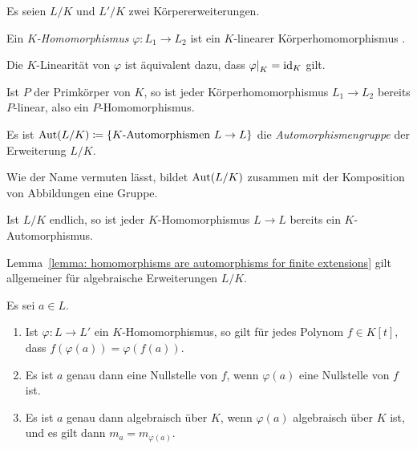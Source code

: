 Es seien $L/K$ und $L'/K$ zwei Körpererweiterungen.

\begin{definition}
  Ein \emph{$K$-Homomorphismus} $\varphi \colon L_1 \to L_2$ ist ein $K$-linearer Körperhomomorphismus .
\end{definition}

\begin{remark}
  Die $K$-Linearität von $\varphi$ ist äquivalent dazu, dass $\restrict{\varphi}{K} = \id_K$ gilt.
\end{remark}

\begin{example}
  Ist $P$ der Primkörper von $K$, so ist jeder Körperhomomorphismus $L_1 \to L_2$ bereits $P$-linear, also ein $P$-Homomorphismus.
\end{example}

\begin{definition}
  Es ist $\operatorname{Aut}(L/K) \coloneqq \{\text{$K$-Automorphismen $L \to L$}\}$ die \emph{Automorphismengruppe} der Erweiterung $L/K$.
\end{definition}

Wie der Name vermuten lässt, bildet $\operatorname{Aut}(L/K)$ zusammen mit der Komposition von Abbildungen eine Gruppe.

\begin{lemma}
  \label{lemma: homomorphisms are automorphisms for finite extensions}
  Ist $L/K$ endlich, so ist jeder $K$-Homomorphismus $L \to L$ bereits ein $K$-Automorphismus.
\end{lemma}

\begin{remark}
  Lemma~\ref{lemma: homomorphisms are automorphisms for finite extensions} gilt allgemeiner für algebraische Erweiterungen $L/K$.
\end{remark}

\begin{lemma}
  Es sei $a \in L$.
  \begin{enumerate}
    \item
      Ist $\varphi \colon L \to L'$ ein $K$-Homomorphismus, so gilt für jedes Polynom $f \in K[t]$, dass $f(\varphi(a)) = \varphi(f(a))$.
    \item
      Es ist $a$ genau dann eine Nullstelle von $f$, wenn $\varphi(a)$ eine Nullstelle von $f$ ist.
    \item
      Es ist $a$ genau dann algebraisch über $K$, wenn $\varphi(a)$ algebraisch über $K$ ist, und es gilt dann $m_a = m_{\varphi(a)}$.
  \end{enumerate}
\end{lemma}

